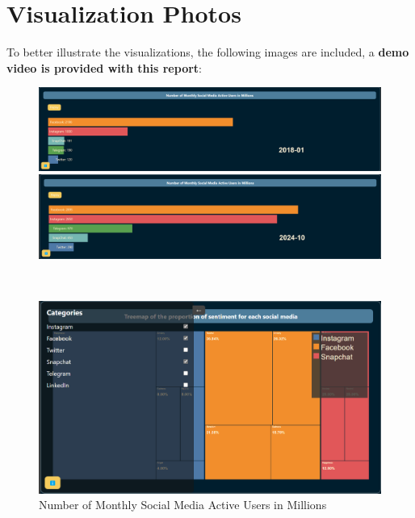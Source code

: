 \documentclass[a4paper,12pt,titlepage,leqno]{article}
\begin{document}
\section{Visualization Photos}
To better illustrate the visualizations, the following images are included, a \textbf{demo video is provided with this report}:
\newpage
\begin{figure}[h!]
\centering
\begin{minipage}{0.48\textwidth}
\centering
\includegraphics[width=\textwidth]{ressources/barChartRace1.png}
\end{minipage}
\begin{minipage}{0.48\textwidth}
\centering
\includegraphics[width=\textwidth]{ressources/barChartRace2.png}
\end{minipage}
\caption{Number of Monthly Social Media Active Users in Millions}
\
\begin{minipage}{0.48\textwidth}
\centering
\includegraphics[width=\textwidth]{ressources/treeMap1.png}
\end{minipage}
\begin{minipage}{0.48\textwidth}
\centering

\end{minipage}
\end{figure}
\end{document}

